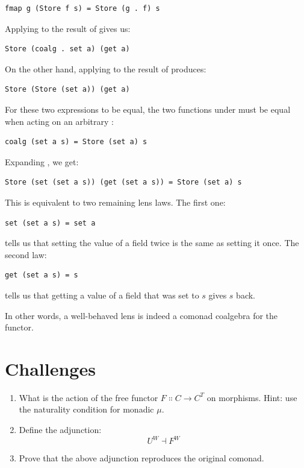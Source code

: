 \begin{Verbatim}
fmap g (Store f s) = Store (g . f) s
\end{Verbatim}
Applying  to the result of  gives us:

\begin{Verbatim}
Store (coalg . set a) (get a)
\end{Verbatim}
On the other hand, applying  to the result of
 produces:

\begin{Verbatim}
Store (Store (set a)) (get a)
\end{Verbatim}
For these two expressions to be equal, the two functions under
 must be equal when acting on an arbitrary :

\begin{Verbatim}
coalg (set a s) = Store (set a) s
\end{Verbatim}
Expanding , we get:

\begin{Verbatim}
Store (set (set a s)) (get (set a s)) = Store (set a) s
\end{Verbatim}
This is equivalent to two remaining lens laws. The first one:

\begin{Verbatim}
set (set a s) = set a
\end{Verbatim}
tells us that setting the value of a field twice is the same as setting
it once. The second law:

\begin{Verbatim}
get (set a s) = s
\end{Verbatim}
tells us that getting a value of a field that was set to $s$
gives $s$ back.

In other words, a well-behaved lens is indeed a comonad coalgebra for
the  functor.

\section{Challenges}

\begin{enumerate}
\tightlist
\item
  What is the action of the free functor
  $F \Colon C \to C^T$ on morphisms. Hint: use the
  naturality condition for monadic $\mu$.
\item
  Define the adjunction:
\[U^W \dashv F^W\]
\item
  Prove that the above adjunction reproduces the original comonad.
\end{enumerate}
